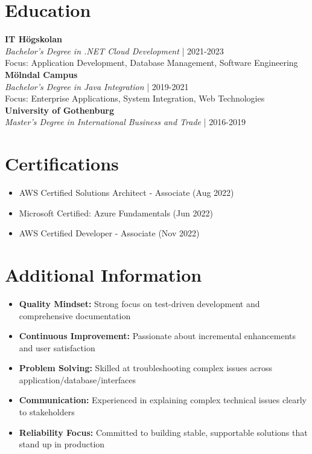 \documentclass[11pt,a4paper]{article}
\begin{document}
\vspace{6pt}
\section*{Education}
\textbf{IT Högskolan}\\
\textit{Bachelor's Degree in .NET Cloud Development} | 2021-2023\\
Focus: Application Development, Database Management, Software Engineering\\
\textbf{Mölndal Campus}\\
\textit{Bachelor's Degree in Java Integration} | 2019-2021\\
Focus: Enterprise Applications, System Integration, Web Technologies\\
\textbf{University of Gothenburg}\\
\textit{Master's Degree in International Business and Trade} | 2016-2019\\

\vspace{6pt}
\section*{Certifications}
\begin{itemize}[noitemsep]
\item AWS Certified Solutions Architect - Associate (Aug 2022)
\item Microsoft Certified: Azure Fundamentals (Jun 2022)
\item AWS Certified Developer - Associate (Nov 2022)
\end{itemize}

\vspace{6pt}
\section*{Additional Information}
\begin{itemize}[noitemsep]
\item \textbf{Quality Mindset:} Strong focus on test-driven development and comprehensive documentation
\item \textbf{Continuous Improvement:} Passionate about incremental enhancements and user satisfaction
\item \textbf{Problem Solving:} Skilled at troubleshooting complex issues across application/database/interfaces
\item \textbf{Communication:} Experienced in explaining complex technical issues clearly to stakeholders
\item \textbf{Reliability Focus:} Committed to building stable, supportable solutions that stand up in production
\end{itemize}
\end{document}
